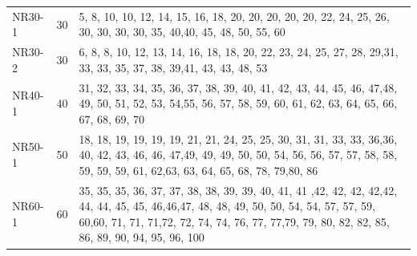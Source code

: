 \documentclass[12pt,a4paper,oneside]{book}
\begin{document}
{\begin{tabularx}{\textwidth}{ l c X }
NR30-1 & 30 & 5, 8, 10, 10, 12, 14, 15, 16, 18, 20, 20, 20, 20, 20, 22, 24, 25, 26, 30, 30, 30, 30, 35, 40,40, 45, 48, 50, 55, 60 \\
NR30-2 & 30 & 6, 8, 8, 10, 12, 13, 14, 16, 18, 18, 20, 22, 23, 24, 25, 27, 28, 29,31, 33, 33, 35, 37, 38, 39,41, 43, 43, 48, 53 \\
NR40-1 & 40 & 31, 32, 33, 34, 35, 36, 37, 38, 39, 40, 41, 42, 43, 44, 45, 46, 47,48, 49, 50, 51, 52, 53, 54,55, 56, 57, 58, 59, 60, 61, 62, 63, 64, 65, 66, 67, 68, 69, 70 \\
NR50-1 & 50 & 18, 18, 19, 19, 19, 19, 21, 21, 24, 25, 25, 30, 31, 31, 33, 33, 36,36, 40, 42, 43, 46, 46, 47,49, 49, 49, 50, 50, 54, 56, 56, 57, 57, 58, 58, 59, 59, 59, 61, 62,63, 63, 64, 65, 68, 78, 79,80, 86 \\
NR60-1 & 60 & 35, 35, 35, 36, 37, 37, 38, 38, 39, 39, 40, 41, 41 ,42, 42, 42, 42,42, 44, 44, 45, 45, 46,46,47, 48, 48, 49, 50, 50, 54, 54, 57, 57, 59, 60,60, 71, 71, 71,72, 72, 74, 74, 76, 77, 77,79, 79, 80, 82, 82, 85, 86, 89, 90, 94, 95, 96, 100 \\


\end{tabularx}}
\end{document}
